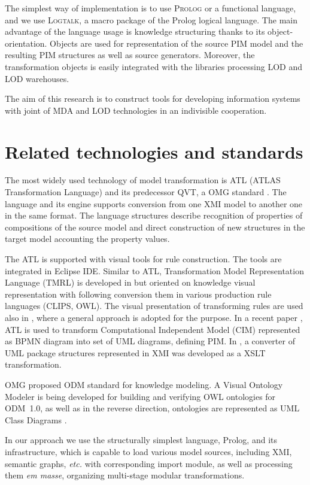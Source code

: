 \documentclass[runningheads]{llncs}
\begin{document}
The simplest way of implementation is to use \textsc{Prolog} or a functional language, and we use \textsc{Logtalk}, a macro package of the Prolog logical language.  The main advantage of the language usage is knowledge structuring thanks to its object-orientation.  Objects are used for representation of the source PIM model and the resulting PIM structures as well as source generators.  Moreover, the transformation objects is easily integrated with the libraries processing LOD and LOD warehouses.

The aim of this research is to construct tools for developing information systems with joint of MDA and LOD technologies in an indivisible cooperation.


\section{Related technologies and standards}
\label{sec:rel}

The most widely used technology of model transformation is ATL (ATLAS Transformation Language) \cite{atl} and its predecessor QVT, a OMG standard \cite{QVT}.  The language and its engine supports conversion from one XMI model to another one in the same format.  The language structures describe recognition of properties of compositions of the source model and direct construction of new structures in the target model accounting the property values.

The ATL is supported with visual tools for rule construction.  The tools are integrated in Eclipse IDE.  Similar to ATL, Transformation Model Representation Language (TMRL) is developed in \cite{nikita} but oriented on knowledge visual representation with following conversion them in various production rule languages (CLIPS, OWL).  The visual presentation of transforming rules are used also in \cite{GT}, where a general approach is adopted for the purpose.  In a recent paper \cite{azis}, ATL is used to transform Computational Independent Model (CIM) represented as BPMN diagram into set of UML diagrams, defining PIM.  In \cite{uml2owl}, a converter of UML package structures represented in XMI was developed as a XSLT transformation.

OMG proposed ODM standard \cite{odmprof} for knowledge modeling.  A Visual Ontology Modeler \cite{odnext} is being developed for building and verifying OWL ontologies for ODM~1.0, as well as in the reverse direction, ontologies are represented as UML Class Diagrams \cite{odmvis}.

In our approach we use the structurally simplest language, Prolog, and its infrastructure, which is capable to load various model sources, including XMI, semantic graphs, \emph{etc.} with corresponding import module, as well as processing them \emph{em masse}, organizing multi-stage modular transformations.
\end{document}
